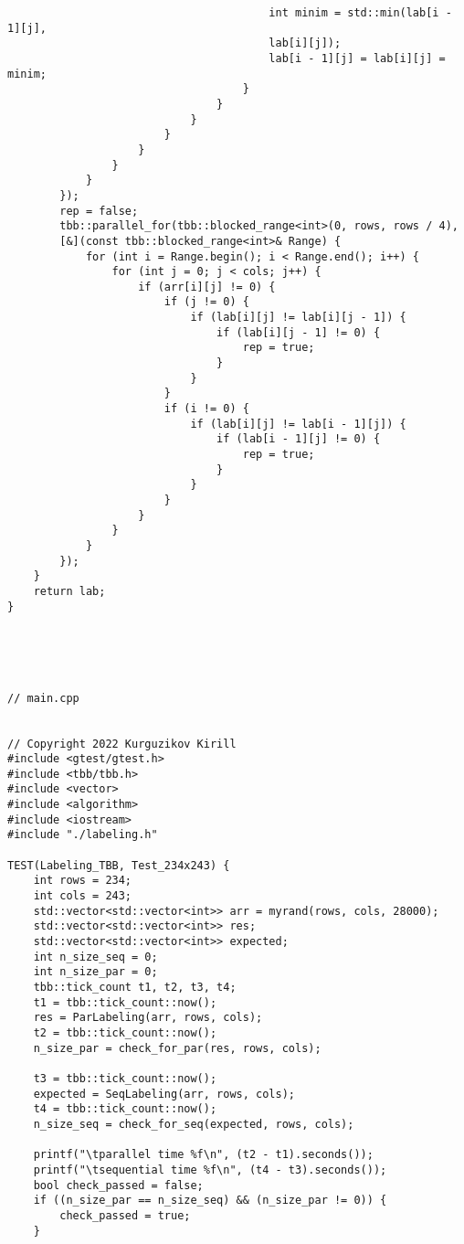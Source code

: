 \documentclass{report}
\begin{document}
\begin{lstlisting}
                                        int minim = std::min(lab[i - 1][j],
                                        lab[i][j]);
                                        lab[i - 1][j] = lab[i][j] = minim;
                                    }
                                }
                            }
                        }
                    }
                }
            }
        });
        rep = false;
        tbb::parallel_for(tbb::blocked_range<int>(0, rows, rows / 4),
        [&](const tbb::blocked_range<int>& Range) {
            for (int i = Range.begin(); i < Range.end(); i++) {
                for (int j = 0; j < cols; j++) {
                    if (arr[i][j] != 0) {
                        if (j != 0) {
                            if (lab[i][j] != lab[i][j - 1]) {
                                if (lab[i][j - 1] != 0) {
                                    rep = true;
                                }
                            }
                        }
                        if (i != 0) {
                            if (lab[i][j] != lab[i - 1][j]) {
                                if (lab[i - 1][j] != 0) {
                                    rep = true;
                                }
                            }
                        }
                    }
                }
            }
        });
    }
    return lab;
}





// main.cpp


// Copyright 2022 Kurguzikov Kirill
#include <gtest/gtest.h>
#include <tbb/tbb.h>
#include <vector>
#include <algorithm>
#include <iostream>
#include "./labeling.h"

TEST(Labeling_TBB, Test_234x243) {
    int rows = 234;
    int cols = 243;
    std::vector<std::vector<int>> arr = myrand(rows, cols, 28000);
    std::vector<std::vector<int>> res;
    std::vector<std::vector<int>> expected;
    int n_size_seq = 0;
    int n_size_par = 0;
    tbb::tick_count t1, t2, t3, t4;
    t1 = tbb::tick_count::now();
    res = ParLabeling(arr, rows, cols);
    t2 = tbb::tick_count::now();
    n_size_par = check_for_par(res, rows, cols);

    t3 = tbb::tick_count::now();
    expected = SeqLabeling(arr, rows, cols);
    t4 = tbb::tick_count::now();
    n_size_seq = check_for_seq(expected, rows, cols);

    printf("\tparallel time %f\n", (t2 - t1).seconds());
    printf("\tsequential time %f\n", (t4 - t3).seconds());
    bool check_passed = false;
    if ((n_size_par == n_size_seq) && (n_size_par != 0)) {
        check_passed = true;
    }


\end{lstlisting}
\end{document}
